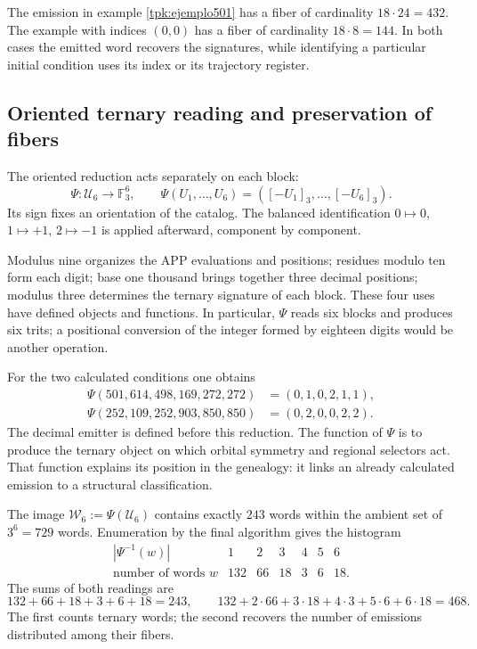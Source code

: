 The emission in example \ref{tpk:ejemplo501} has a fiber of cardinality
\(18\cdot24=432\). The example with indices \((0,0)\) has a fiber of
cardinality \(18\cdot8=144\). In both cases the emitted word recovers
the signatures, while identifying a particular initial condition
uses its index or its trajectory register.

\subsection{Oriented ternary reading and preservation of fibers}
\label{tpk:reduccion-ternaria}

The oriented reduction acts separately on each block:
\begin{equation}
 \Psi:\mathcal U_6\longrightarrow\mathbb F_3^6,\qquad
 \Psi(U_1,\ldots,U_6)=([-U_1]_3,\ldots,[-U_6]_3).
 \label{tpk:psi}
\end{equation}
Its sign fixes an orientation of the catalog. The balanced identification
\(0\mapsto0\), \(1\mapsto+1\), \(2\mapsto-1\) is applied afterward,
component by component.

Modulus nine organizes the APP evaluations and positions; residues
modulo ten form each digit; base one thousand brings together three decimal positions;
modulus three determines the ternary signature of each block. These four uses
have defined objects and functions. In particular, \(\Psi\) reads six
blocks and produces six trits; a positional conversion of the integer formed
by eighteen digits would be another operation.

For the two calculated conditions one obtains
\begin{align*}
 \Psi(501,614,498,169,272,272)&=(0,1,0,2,1,1),\\
 \Psi(252,109,252,903,850,850)&=(0,2,0,0,2,2).
\end{align*}
The decimal emitter is defined before this reduction. The function of
\(\Psi\) is to produce the ternary object on which orbital
symmetry and regional selectors act. That function explains its position in the
genealogy: it links an already calculated emission to a structural classification.

The image \(\mathcal W_6:=\Psi(\mathcal U_6)\) contains exactly
\(243\) words within the ambient set of \(3^6=729\) words.
Enumeration by the final algorithm gives the histogram
\begin{equation}
\begin{array}{c|rrrrrr}
 |\Psi^{-1}(w)|&1&2&3&4&5&6\\\hline
 \text{number of words }w&132&66&18&3&6&18.
\end{array}
\label{tpk:fibras-ternarias}
\end{equation}
The sums of both readings are
\[
132+66+18+3+6+18=243,
\qquad132+2\cdot66+3\cdot18+4\cdot3+5\cdot6+6\cdot18=468.
\]
The first counts ternary words; the second recovers the number of
emissions distributed among their fibers.


